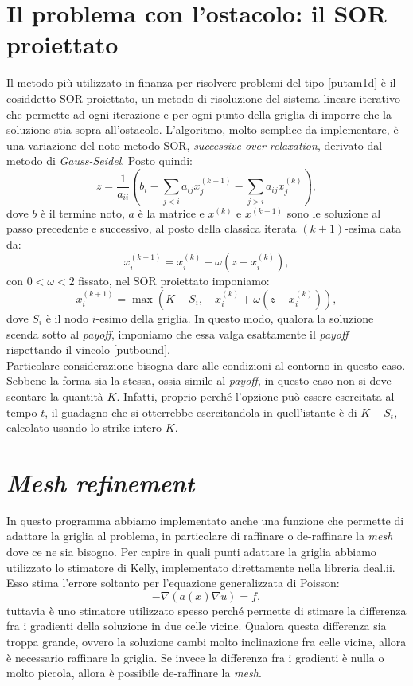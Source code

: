 \documentclass[a4paper,10pt]{report}
\theoremstyle{plain}
\theoremstyle{definition}
\theoremstyle{remark}
\begin{document}
\section{Il problema con l'ostacolo: il SOR proiettato}
Il metodo pi\`u utilizzato in finanza per risolvere problemi del tipo \eqref{putam1d}  \`e il cosiddetto SOR proiettato, un metodo di risoluzione del sistema lineare iterativo che permette ad ogni iterazione e per ogni punto della griglia di imporre che la soluzione stia sopra all'ostacolo. L'algoritmo, molto semplice da implementare, \`e una variazione del noto metodo SOR, \emph{successive over-relaxation}, derivato dal metodo di \emph{Gauss-Seidel}. Posto quindi: $$z=\frac{1}{a_{ii}}\left(b_i-\sum_{j<i}a_{ij}x_j^{(k+1)}-\sum_{j>i}a_{ij}x_j^{(k)}\right),$$dove $b$ \`e il termine noto, $a$ \`e la matrice e $x^{(k)}$ e $x^{(k+1)}$ sono le soluzione al passo precedente e successivo, al posto della classica iterata $(k+1)$-esima data da: $$x_i^{(k+1)}=x_i^{(k)}+\omega(z-x_i^{(k)}),$$con $0<\omega<2$ fissato, nel SOR proiettato imponiamo: $$x_i^{(k+1)}=\max\left(K-S_i,\quad x_i^{(k)}+\omega(z-x_i^{(k)})\right),$$dove $S_i$ \`e il nodo $i$-esimo della griglia. In questo modo, qualora la soluzione scenda sotto al \emph{payoff}, imponiamo che essa valga esattamente il \emph{payoff} rispettando il vincolo \eqref{putbound}.\\
Particolare considerazione bisogna dare alle condizioni al contorno in questo caso. Sebbene la forma sia la stessa, ossia simile al \emph{payoff}, in questo caso non si deve scontare la quantità $K$. Infatti, proprio perché l'opzione può essere esercitata al tempo $t$, il guadagno che si otterrebbe esercitandola in quell'istante è di $K-S_t$, calcolato usando lo strike intero $K$.

\section{\emph{Mesh refinement}}
In questo programma abbiamo implementato anche una funzione che permette di adattare la griglia al problema, in particolare di raffinare o de-raffinare la \emph{mesh} dove ce ne sia bisogno. Per capire in quali punti adattare la griglia abbiamo utilizzato lo stimatore di Kelly, implementato direttamente nella libreria \textsf{deal.ii}. Esso stima l'errore soltanto per l'equazione generalizzata di Poisson: $$-\nabla\left(a(x)\nabla u\right)=f,$$tuttavia \`e uno stimatore utilizzato spesso perch\'e permette di stimare la differenza fra i gradienti della soluzione in due celle vicine. Qualora questa differenza sia troppa grande, ovvero la soluzione cambi molto inclinazione fra celle vicine, allora \`e necessario raffinare la griglia. Se invece la differenza fra i gradienti \`e nulla o molto piccola, allora \`e possibile de-raffinare la \emph{mesh}.
\end{document}

